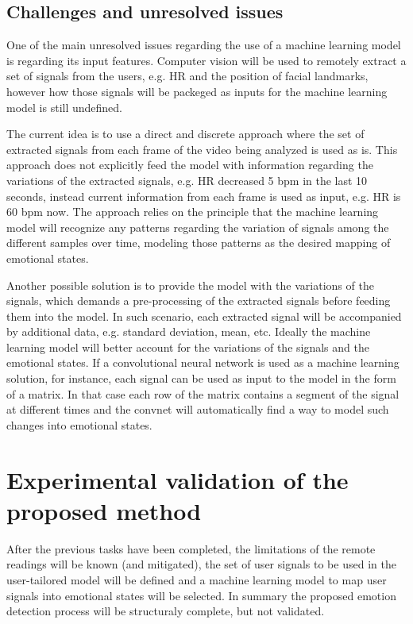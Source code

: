 \subsection{Challenges and unresolved issues}

One of the main unresolved issues regarding the use of a machine learning model is regarding its input features. Computer vision will be used to remotely extract a set of signals from the users, e.g. HR and the position of facial landmarks, however how those signals will be packeged as inputs for the machine learning model is still undefined.

The current idea is to use a direct and discrete approach where the set of extracted signals from each frame of the video being analyzed is used as is. This approach does not explicitly feed the model with information regarding the variations of the extracted signals, e.g. HR decreased 5 bpm in the last 10 seconds, instead current information from each frame is used as input, e.g. HR is 60 bpm now. The approach relies on the principle that the machine learning model will recognize any patterns regarding the variation of signals among the different samples over time, modeling those patterns as the desired mapping of emotional states.

Another possible solution is to provide the model with the variations of the signals, which demands a pre-processing of the extracted signals before feeding them into the model. In such scenario, each extracted signal will be accompanied by additional data, e.g. standard deviation, mean, etc. Ideally the machine learning model will better account for the variations of the signals and the emotional states. If a convolutional neural network is used as a machine learning solution, for instance, each signal can be used as input to the model in the form of a matrix. In that case each row of the matrix contains a segment of the signal at different times and the convnet will automatically find a way to model such changes into emotional states.

\section{Experimental validation of the proposed method}
\label{closing:emotion-detection-experiment}

After the previous tasks have been completed, the limitations of the remote readings will be known (and mitigated), the set of user signals to be used in the user-tailored model will be defined and a machine learning model to map user signals into emotional states will be selected. In summary the proposed emotion detection process will be structuraly complete, but not validated.

